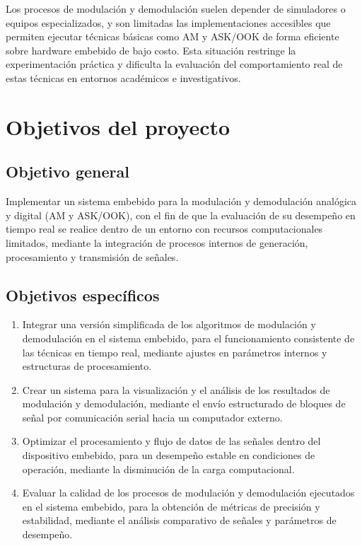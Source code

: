 Los procesos de modulación y demodulación suelen depender de simuladores o equipos especializados, y son limitadas las implementaciones accesibles que permiten ejecutar técnicas básicas como AM y ASK/OOK de forma eficiente sobre hardware embebido de bajo costo. Esta situación restringe la experimentación práctica y dificulta la evaluación del comportamiento real de estas técnicas en entornos académicos e investigativos.

\section{Objetivos del proyecto}

\subsection{Objetivo general}

Implementar un sistema embebido para la modulación y demodulación analógica y digital (AM y ASK/OOK), con el fin de que la evaluación de su desempeño en tiempo real se realice dentro de un entorno con recursos computacionales limitados, mediante la integración de procesos internos de generación, procesamiento y transmisión de señales.
\subsection{Objetivos específicos}

\begin{enumerate}
\item Integrar una versión simplificada de los algoritmos de modulación y demodulación en el sistema embebido, para el funcionamiento consistente de las técnicas en tiempo real, mediante ajustes en parámetros internos y estructuras de procesamiento.
  
\item Crear un sistema para la visualización y el análisis de los resultados de modulación y demodulación, mediante el envío estructurado de bloques de señal por comunicación serial hacia un computador externo.

\item Optimizar el procesamiento y flujo de datos de las señales dentro del dispositivo embebido, para un desempeño estable en condiciones de operación, mediante la disminución de la carga computacional.

\item Evaluar la calidad de los procesos de modulación y demodulación ejecutados en el sistema embebido, para la obtención de métricas de precisión y estabilidad, mediante el análisis comparativo de señales y parámetros de desempeño.
\end{enumerate}


